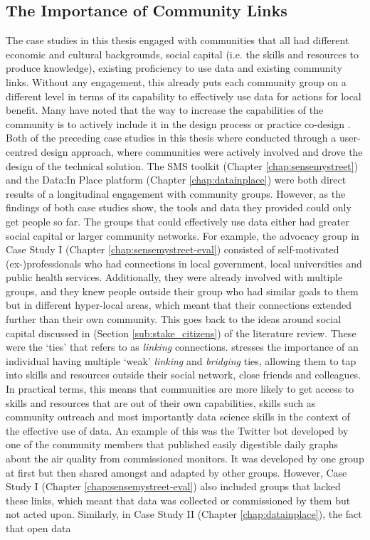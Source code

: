 \subsection{The Importance of Community Links}
\label{sub:comm_links}
The case studies in this thesis engaged with communities that all had different economic and cultural backgrounds, social capital (i.e. the skills and resources to produce knowledge), existing proficiency to use data and existing community links. Without any engagement, this already puts each community group on a different level in terms of its capability to effectively use data for actions for local benefit. Many have noted that the way to increase the capabilities of the community is to actively include it in the design process or practice co-design \citep{disalvo_neighborhood_2008,dantec_infrastructuring_2013,bernarda_design_2017,ferreira_social_2020}. Both of the preceding case studies in this thesis where conducted through a user-centred design approach, where communities were actively involved and drove the design of the technical solution. The SMS toolkit (Chapter \ref{chap:sensemystreet}) and the Data:In Place platform (Chapter \ref{chap:datainplace}) were both direct results of a longitudinal engagement with community groups. However, as the findings of both case studies show, the tools and data they provided could only get people so far. The groups that could effectively use data either had greater social capital or larger community networks. For example, the advocacy group in Case Study I (Chapter \ref{chap:sensemystreet-eval}) consisted of self-motivated (ex-)professionals who had connections in local government, local universities and public health services. Additionally, they were already involved with multiple groups, and they knew people outside their group who had similar goals to them but in different hyper-local areas, which meant that their connections extended further than their own community. This goes back to the ideas around social capital \citep{coleman_social_1988} discussed in (Section \ref{sub:stake_citizens}) of the literature review. These were the `ties' that \citet{granovetter_strength_1983} refers to as \textit{linking} connections. \citet{granovetter_strength_1983} stresses the importance of an individual having multiple `weak' \textit{linking} and \textit{bridging} ties, allowing them to tap into skills and resources outside their social network, close friends and colleagues. In practical terms, this means that communities are more likely to get access to skills and resources that are out of their own capabilities, skills such as community outreach and most importantly data science skills in the context of the effective use of data. An example of this was the Twitter bot developed by one of the community members that published easily digestible daily graphs about the air quality from commissioned monitors. It was developed by one group at first but then shared amongst and adapted by other groups. However, Case Study I (Chapter \ref{chap:sensemystreet-eval}) also included groups that lacked these links, which meant that data was collected or commissioned by them but not acted upon. Similarly, in Case Study II (Chapter \ref{chap:datainplace}), the fact that open data 